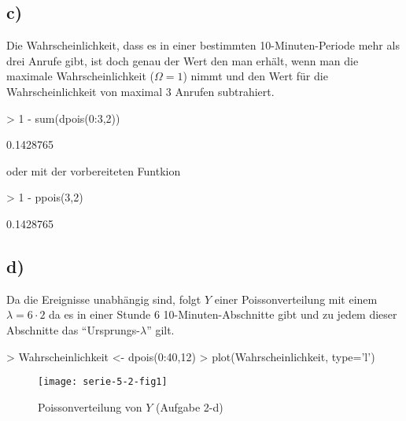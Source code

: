 \subsection*{c)}
Die Wahrscheinlichkeit, dass es in einer bestimmten 10-Minuten-Periode
mehr als drei Anrufe gibt, ist doch genau der Wert den man erhält, wenn
man die maximale Wahrscheinlichkeit ($\Omega = 1$) nimmt und den Wert für 
die Wahrscheinlichkeit von maximal $3$ Anrufen subtrahiert.
\begin{Schunk}
\begin{Sinput}
> 1 - sum(dpois(0:3,2))
\end{Sinput}
\begin{Soutput}
[1] 0.1428765
\end{Soutput}
\end{Schunk}
oder mit der vorbereiteten Funtkion
\begin{Schunk}
\begin{Sinput}
> 1 - ppois(3,2)
\end{Sinput}
\begin{Soutput}
[1] 0.1428765
\end{Soutput}
\end{Schunk}

\subsection*{d)}
Da die Ereignisse unabhängig sind, folgt $Y$ einer Poissonverteilung mit
einem $\lambda = 6 \cdot 2$ da es in einer Stunde 6 10-Minuten-Abschnitte gibt
und zu jedem dieser Abschnitte das ``Ursprungs-$\lambda$'' gilt.
\begin{Schunk}
\begin{Sinput}
> Wahrscheinlichkeit <- dpois(0:40,12)
> plot(Wahrscheinlichkeit, type='l')
\end{Sinput}
\end{Schunk}
\begin{figure}[h]
\begin{center}
\texttt{[image: serie-5-2-fig1]}
\caption{Poissonverteilung von $Y$ (Aufgabe 2-d)}
\end{center}
\end{figure}


